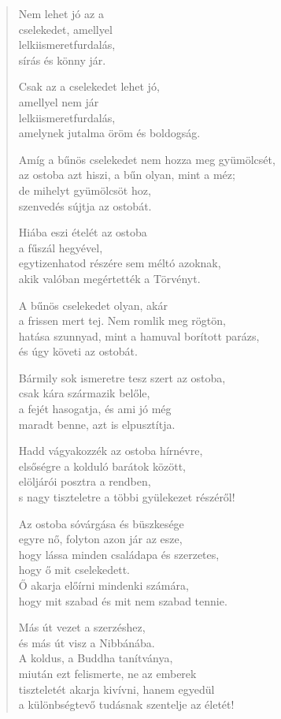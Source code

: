 \begin{verse}
 Nem lehet jó az a\\
cselekedet, amellyel\\
lelkiismeretfurdalás,\\
sírás és könny jár.

 Csak az a cselekedet lehet jó,\\
amellyel nem jár\\
lelkiismeretfurdalás,\\
amelynek jutalma öröm és boldogság.

 Amíg a bűnös cselekedet nem hozza meg gyümölcsét,\\
az ostoba azt hiszi, a bűn olyan, mint a méz;\\
de mihelyt gyümölcsöt hoz,\\
szenvedés sújtja az ostobát.

 Hiába eszi ételét az ostoba\\
a fűszál hegyével,\\
egytizenhatod részére sem méltó azoknak,\\
akik valóban megértették a Törvényt.

 A bűnös cselekedet olyan, akár\\
a frissen mert tej. Nem romlik meg rögtön,\\
hatása szunnyad, mint a hamuval borított parázs,\\
és úgy követi az ostobát.

 Bármily sok ismeretre tesz szert az ostoba,\\
csak kára származik belőle,\\
a fejét hasogatja, és ami jó még\\
maradt benne, azt is elpusztítja.

 Hadd vágyakozzék az ostoba hírnévre,\\
elsőségre a kolduló barátok között,\\
elöljárói posztra a rendben,\\
s nagy tiszteletre a többi gyülekezet részéről!

 Az ostoba sóvárgása és büszkesége\\
egyre nő, folyton azon jár az esze,\\
hogy lássa minden családapa és szerzetes,\\
hogy ő mit cselekedett.\\
Ő akarja előírni mindenki számára,\\
hogy mit szabad és mit nem szabad tennie.

\newpage

 Más út vezet a szerzéshez,\\
és más út visz a Nibbánába.\\
A koldus, a Buddha tanítványa,\\
miután ezt felismerte, ne az emberek\\
tiszteletét akarja kivívni, hanem egyedül\\
a különbségtevő tudásnak szentelje az életét!

\end{verse}


